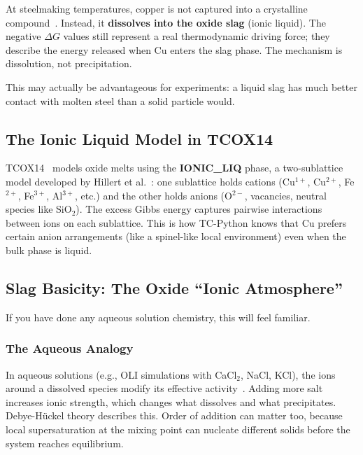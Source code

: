 \documentclass[11pt]{article}
\begin{document}
\begin{insight}[Cu Capture = Slag Dissolution]
At steelmaking temperatures, copper is not captured into a crystalline compound~\cite{Porter2021}. Instead, it \textbf{dissolves into the oxide slag} (ionic liquid). The negative $\Delta G$ values still represent a real thermodynamic driving force; they describe the energy released when Cu enters the slag phase. The mechanism is dissolution, not precipitation.

This may actually be advantageous for experiments: a liquid slag has much better contact with molten steel than a solid particle would.
\end{insight}

\subsection{The Ionic Liquid Model in TCOX14}

TCOX14~\cite{TCOX14} models oxide melts using the \textbf{IONIC\_LIQ} phase, a two-sublattice model developed by Hillert et al.~\cite{Hillert2007}: one sublattice holds cations (Cu$^{1+}$, Cu$^{2+}$, Fe$^{2+}$, Fe$^{3+}$, Al$^{3+}$, etc.) and the other holds anions (O$^{2-}$, vacancies, neutral species like SiO$_2$). The excess Gibbs energy captures pairwise interactions between ions on each sublattice. This is how TC-Python knows that Cu prefers certain anion arrangements (like a spinel-like local environment) even when the bulk phase is liquid.

\subsection{Slag Basicity: The Oxide ``Ionic Atmosphere''}
\label{sec:ionic_atmosphere}

If you have done any aqueous solution chemistry, this will feel familiar.

\subsubsection{The Aqueous Analogy}

In aqueous solutions (e.g., OLI simulations with CaCl$_2$, NaCl, KCl), the ions around a dissolved species modify its effective activity~\cite{Gaskell2024}. Adding more salt increases ionic strength, which changes what dissolves and what precipitates. Debye-H\"uckel theory describes this. Order of addition can matter too, because local supersaturation at the mixing point can nucleate different solids before the system reaches equilibrium.
\end{document}
